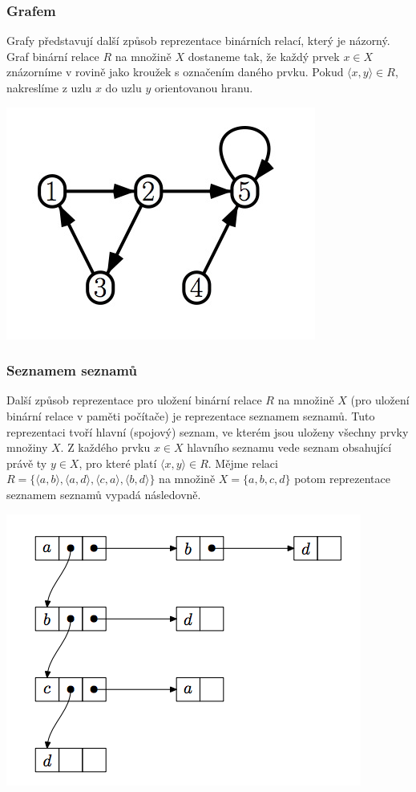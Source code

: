 \documentclass[12pt,a4paper]{article}
\begin{document}
\subsubsection{Grafem}
Grafy představují další způsob reprezentace binárních relací, který je názorný. Graf binární relace $R$ na množině $X$ dostaneme tak, že každý prvek $x \in X$ znázorníme v rovině jako kroužek s označením daného prvku. Pokud $\langle x,y \rangle \in R$, nakreslíme z uzlu $x$ do uzlu $y$ orientovanou hranu.

\begin{center}
	\includegraphics[scale=0.6]{img/RelationGraph}
\end{center}

\subsubsection{Seznamem seznamů}
Další způsob reprezentace pro uložení binární relace $R$ na množině $X$ (pro uložení binární relace v paměti počítače) je reprezentace seznamem seznamů. Tuto reprezentaci tvoří hlavní (spojový) seznam, ve kterém jsou uloženy všechny prvky množiny $X$. Z každého prvku $x \in X$ hlavního seznamu vede seznam obsahující právě ty $y \in X$, pro které platí $\langle x, y \rangle \in R$. Mějme relaci $R = \{\langle a, b\rangle,\langle a, d\rangle,\langle c, a\rangle,\langle b, d\rangle\}$ na množině $X = \{a,b,c,d\}$ potom reprezentace seznamem seznamů vypadá následovně.

\begin{center}
	\includegraphics[scale=0.6]{img/RelationList}
\end{center}
\end{document}
